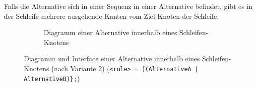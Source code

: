 \documentclass[../InterneDSLs.tex]{subfiles}
\begin{document}
Falls die Alternative sich in einer Sequenz in einer Alternative befindet, gibt es in der Schleife mehrere ausgehende Kanten vom Ziel-Knoten der Schleife.
\begin{figure}[ht]
\centering
  \begin{subfigure}[c]{0.49\textwidth}
    \caption{Diagramm einer Alternative innerhalb eines Schleifen-Knotens}
    \label{FIG:DiagramAlternativeInLoop}
  \end{subfigure}
  \begin{subfigure}[c]{0.49\textwidth}
    
  \end{subfigure}
  \caption[Abbildung einer Alternative innerhalb einer Schleife]{Diagramm und Interface einer Alternative innerhalb eines Schleifen-Knotens (nach Variante 2) (\texttt{<rule> = \{(AlternativeA | AlternativeB)\};})}
  \label{FIG:AlternativeInLoop}
\end{figure}
\end{document}
